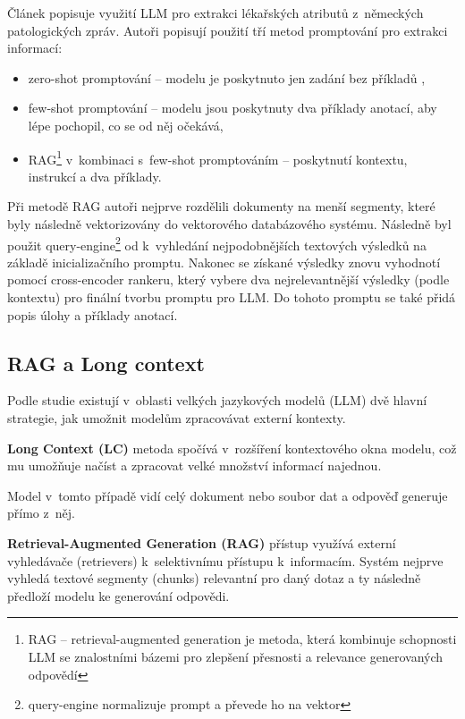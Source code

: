 \documentclass[czech, bc, kiv, he, iso690numb, pdf]{fasthesis}
\begin{document}
Článek \cite{cancer-relative-medical-attributes} popisuje využití LLM pro extrakci lékařských atributů z~německých patologických zpráv. Autoři popisují použití tří metod promptování pro extrakci informací:
\begin{itemize}
    \item zero-shot promptování -- modelu je poskytnuto jen zadání bez příkladů \cite{efficient-large-scale-llm},
    \item few-shot promptování -- modelu jsou poskytnuty dva příklady anotací, aby lépe pochopil, co se od něj očekává,
    \item RAG\footnote{RAG -- retrieval-augmented generation je metoda, která kombinuje schopnosti LLM se znalostními bázemi pro zlepšení přesnosti a relevance generovaných odpovědí} v~kombinaci s~few-shot promptováním -- poskytnutí kontextu, instrukcí a dva příklady.
\end{itemize}

Při metodě RAG autoři nejprve rozdělili dokumenty na menší segmenty, které byly následně vektorizovány do vektorového databázového systému. Následně byl použit query-engine\footnote{query-engine normalizuje prompt a převede ho na vektor} od  k~vyhledání nejpodobnějších textových výsledků na základě inicializačního promptu. Nakonec se získané výsledky znovu vyhodnotí pomocí cross-encoder rankeru, který vybere dva nejrelevantnější výsledky (podle kontextu) pro finální tvorbu promptu pro LLM. Do tohoto promptu se také přidá popis úlohy a příklady anotací.

\subsection{RAG a Long context}
\label{sec:rag}
Podle studie \cite{rag-vs-lc-eval} existují v~oblasti velkých jazykových modelů (LLM) dvě hlavní strategie, jak umožnit modelům zpracovávat externí kontexty.

\textbf{Long Context (LC)} metoda spočívá v~rozšíření kontextového okna modelu, což mu umožňuje načíst a zpracovat velké množství informací najednou.

Model v~tomto případě vidí celý dokument nebo soubor dat a odpověď generuje přímo z~něj.

\textbf{Retrieval-Augmented Generation (RAG)} přístup využívá externí vyhledávače (retrievers) k~selektivnímu přístupu k~informacím. Systém nejprve vyhledá textové segmenty (chunks) relevantní pro daný dotaz a ty následně předloží modelu ke generování odpovědi.
\end{document}

